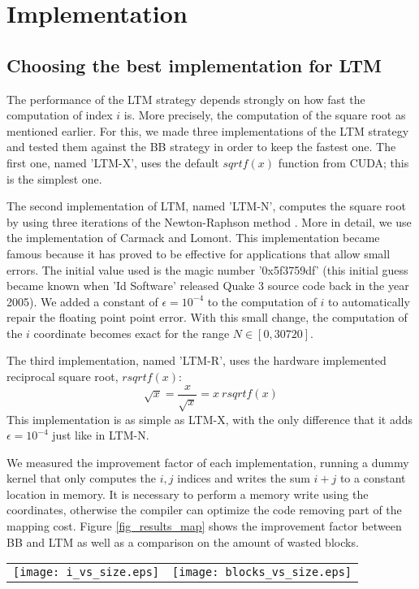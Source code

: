 \documentclass[conference]{IEEEtran}
\begin{document}
\section{Implementation}
\label{sec_implementation}
\subsection{Choosing the best implementation for LTM}
The performance of the LTM strategy depends strongly on how fast the computation of index $i$ is. More precisely, the 
computation of the square root as mentioned earlier. 
For this, we made three implementations of the LTM strategy and tested them against the BB strategy in order to keep the fastest one. 
The first one, named 'LTM-X', uses the default $sqrtf(x)$ function from CUDA; this is the simplest one. 

The second implementation of LTM, named 'LTM-N', computes the square root by using three iterations of the Newton-Raphson method 
\cite{Ypma:1995:HDN:222504.222510, Peelle:1974:TNS:585882.585889}. More in detail, we use the implementation of Carmack and Lomont. 
This implementation became famous because it has proved to be effective for applications that allow small errors.
The initial value used is the magic number '0x5f3759df' (this initial guess became known when 'Id Software' released Quake 3 source code back in the year 2005). 
We added a constant of $\epsilon = 10^{-4}$ to the computation of $i$ to automatically repair the floating point point error. 
With this small change, the computation of the $i$ coordinate becomes exact for the range $N \in [0, 30720]$.

The third implementation, named 'LTM-R', uses the hardware implemented reciprocal square root, $rsqrtf(x)$:
\begin{equation}
\sqrt{x} = \frac{x}{\sqrt{x}} = x\ rsqrtf(x) 
\end{equation}
This implementation is as simple as LTM-X, with the only difference that it adds $\epsilon = 10^{-4}$ just like in LTM-N.

We measured the improvement factor of each implementation, running a dummy kernel that only computes the $i,j$ indices and writes 
the sum $i+j$ to a constant location in memory. It is necessary to perform a memory write using the coordinates, otherwise the compiler 
can optimize the code removing part of the mapping cost. 
Figure \ref{fig_results_map} shows the improvement factor between BB and LTM as well as a comparison on the amount of wasted blocks.
\begin{figure*}[ht!]
\centering
\begin{tabular}{cc}
\texttt{[image: i\_vs\_size.eps]} & \texttt{[image: blocks\_vs\_size.eps]}
\end{tabular}
\caption{Only the LTM-R implementation runs faster than the BB strategy. On the right, the number of wasted blocks a a function of $N$.}
\label{fig_results_map}
\end{figure*}
\end{document}
